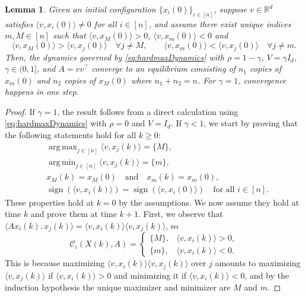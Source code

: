 \documentclass[10pt,a4paper]{amsart}
\newtheorem{lemma}{Lemma}
\newcommand{\R}{\mathbb{R}}
\DeclareMathOperator*{\argmax}{arg\,max}
\DeclareMathOperator*{\argmin}{arg\,min}
\newcommand{\ip}[2]{\langle #1, #2 \rangle}
\begin{document}
\begin{lemma}\label{lem:rank1-asymptotics}
Given an initial configuration $\{ x_i(0) \}_{i \in [n]}$, suppose $v\in \R^d$ satisfies $\ip{v}{x_i(0)} \neq 0$ for all $i \in [n]$, and assume there exist unique indices $m,M\in [n]$ such that $\ip{v}{x_M(0)} > 0$, $\ip{v}{x_m(0)} < 0$ and 
$$
    \ip{v}{x_M(0)} > \ip{v}{x_j(0)} \quad \forall j \neq M,
    \qquad 
    \ip{v}{x_m(0)} < \ip{v}{x_j(0)} \quad \forall j \neq m.
$$
Then, the dynamics governed by \eqref{eq:hardmaxDynamics} with $\rho = 1 - \gamma$, $V= \gamma I_d$, $\gamma\in (0,1]$, and $A = vv^\top$ converge to an equilibrium consisting of $n_1$ copies of $x_m(0)$ and $n_2$ copies of $x_M(0)$ where $n_1 + n_2 = n$. For $\gamma=1$, convergence happens in one step.
\end{lemma}

\begin{proof}
If $\gamma=1$, the result follows from a direct calculation using  \eqref{eq:hardmaxDynamics} with $\rho=0$ and $V= I_d$.
If $\gamma < 1$, we start by proving that the following statements hold for all $k\geq 0$:
\begin{align}
&\argmax_{j\in[n]} \langle v, x_j(k)\rangle = \{M\}, \label{eq:(a)} \\
&\argmin_{j\in[n]} \langle v, x_j(k)\rangle = \{m\}, \label{eq:(b)} \\
&x_M(k) = x_M(0) \quad \text{and} \quad x_m(k) = x_m(0), \label{eq:(c)} \\[1em]
&\operatorname{sign}(\langle v, x_i(k)\rangle) = 
\operatorname{sign}(\langle v, x_i(0)\rangle) 
\quad \text{for all } i\in[n]. \label{eq:(d)}
\end{align}
These properties hold at $k=0$ by the assumptions. We now assume they hold at time $k$ and prove them at time $k+1$. First, we observe that
$\langle A x_i(k), x_j(k)\rangle
= \langle v, x_i(k)\rangle \langle v, x_j(k)\rangle$,
so
\[
\mathcal{C}_i(X(k),A)
=
\begin{cases}
\{M\}, & \langle v, x_i(k)\rangle > 0,\\
\{m\}, & \langle v, x_i(k)\rangle < 0.
\end{cases}
\]
This is because maximizing $\langle v, x_i(k)\rangle\langle v, x_j(k)\rangle$ over $j$ amounts to maximizing
$\langle v, x_j(k)\rangle$ if $\langle v, x_i(k)\rangle>0$ and minimizing it if $\langle v, x_i(k)\rangle<0$, and by the induction hypothesis the unique maximizer and minimizer are $M$ and $m$.


\end{proof}
\end{document}
